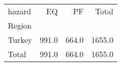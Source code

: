 \begin{tabular}{lrrr}
\toprule
hazard &     EQ &     PF &   Total \\
Region &        &        &         \\
\midrule
Turkey &  991.0 &  664.0 &  1655.0 \\
Total  &  991.0 &  664.0 &  1655.0 \\
\bottomrule
\end{tabular}
